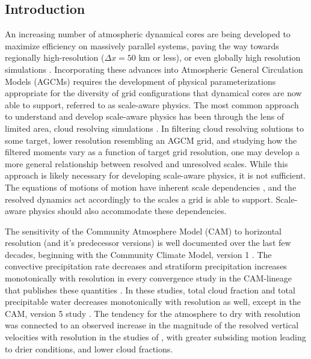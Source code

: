 \subsection{Introduction}

An increasing number of atmospheric dynamical cores are being developed to maximize efficiency on massively parallel systems, paving the way towards regionally high-resolution ($\Delta x = 50$ km or less), or even globally high resolution simulations \citep{MPASatm,Z2014QJRMS,HETAL2016JCLIM,DCMIP16,LetAl2018JAMES}. Incorporating these advances into Atmospheric General Circulation Models (AGCMs) requires the development of physical parameterizations appropriate for the diversity of grid configurations that dynamical cores are now able to support, referred to as scale-aware physics. The most common approach to understand and develop scale-aware physics has been through the lens of limited area, cloud resolving simulations \citep{PC2008JAS,AW2013JAS,SZ2018JCLIM}. In filtering cloud resolving solutions to some target, lower resolution resembling an AGCM grid, and studying how the filtered moments vary as a function of target grid resolution, one may develop a more general relationship between resolved and unresolved scales. While this approach is likely necessary for developing scale-aware physics, it is not sufficient. The equations of motions of motion have inherent scale dependencies \citep{O1981JAS,WETAL1997MWR,PG2006JAS,J2017JAMES}, and the resolved dynamics act accordingly to the scales a grid is able to support. Scale-aware physics should also accommodate these dependencies.

The sensitivity of the Community Atmosphere Model (CAM) to horizontal resolution (and it's predecessor versions) is well documented over the last few decades, beginning with the Community Climate Model, version 1 \citep{KW1991JGR}. The convective precipitation rate decreases and stratiform precipitation increases monotonically with resolution in every convergence study in the CAM-lineage that publishes these quantities \citep{KW1991JGR,WETAL1995CD,W2008TELLUS,RETAL2013JCLIM,ZetAl2014JCb,HR2017JCLIM}. In these studies, total cloud fraction and total precipitable water decreases monotonically with resolution as well, except in the CAM, version 5 study \citep[CAM5;][]{ZetAl2014JCb}. The tendency for the atmosphere to dry with resolution was connected to an observed increase in the magnitude of the resolved vertical velocities with resolution in the studies of \citep{KW1991JGR,WETAL1995CD}, with greater subsiding motion leading to drier conditions, and lower cloud fractions.

